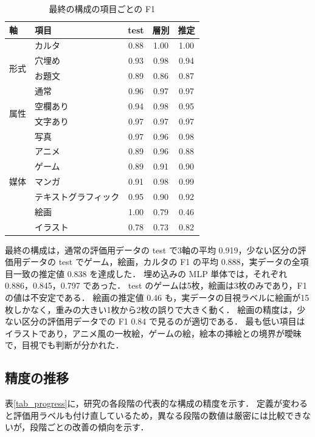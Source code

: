 \begin{table}[t]
    \centering
    \caption{最終の構成の項目ごとの F1}
    \label{tab_final_items}
    \small
    \begin{tabular}{llccc}
        \toprule
        軸 & 項目 & test & 層別 & 推定 \\
        \midrule
        \multirow{4}{*}{形式} & カルタ & 0.88 & 1.00 & 1.00 \\
         & 穴埋め & 0.93 & 0.98 & 0.94 \\
         & お題文 & 0.89 & 0.86 & 0.87 \\
         & 通常 & 0.96 & 0.97 & 0.97 \\
        \midrule
        \multirow{2}{*}{属性} & 空欄あり & 0.94 & 0.98 & 0.95 \\
         & 文字あり & 0.97 & 0.97 & 0.97 \\
        \midrule
        \multirow{7}{*}{媒体} & 写真 & 0.97 & 0.96 & 0.98 \\
         & アニメ & 0.89 & 0.96 & 0.88 \\
         & ゲーム & 0.89 & 0.91 & 0.90 \\
         & マンガ & 0.91 & 0.98 & 0.99 \\
         & テキストグラフィック & 0.95 & 0.90 & 0.92 \\
         & 絵画 & 1.00 & 0.79 & 0.46 \\
         & イラスト & 0.78 & 0.73 & 0.82 \\
        \bottomrule
    \end{tabular}
\end{table}

最終の構成は，通常の評価用データの test で3軸の平均 0.919，少ない区分の評価用データの test でゲーム，絵画，カルタの F1 の平均 0.888，実データの全項目一致の推定値 0.838 を達成した．
埋め込みの MLP 単体では，それぞれ 0.886，0.845，0.797 であった．
test のゲームは5枚，絵画は3枚のみであり，F1 の値は不安定である．
絵画の推定値 0.46 も，実データの目視ラベルに絵画が15枚しかなく，重みの大きい1枚から2枚の誤りで大きく動く．
絵画の精度は，少ない区分の評価用データでの F1 0.84 で見るのが適切である．
最も低い項目はイラストであり，アニメ風の一枚絵，ゲームの絵，絵本の挿絵との境界が曖昧で，目視でも判断が分かれた．

\subsection{精度の推移}
表\ref{tab_progress}に，研究の各段階の代表的な構成の精度を示す．
定義が変わると評価用ラベルも付け直しているため，異なる段階の数値は厳密には比較できないが，段階ごとの改善の傾向を示す．

